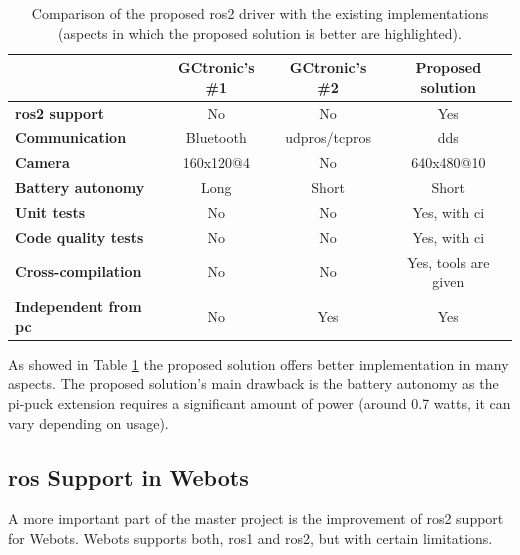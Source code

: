 \begin{table}[H]
    \begin{adjustwidth}{-1.5in}{-1.5in}
    \centering
    \begin{tabular}{|l|c|c|c|}
         \hline
         & \textbf{GCtronic's \#1} & \textbf{GCtronic's \#2} & \textbf{Proposed solution} \\
         \hline
         \rowcolor{lightgray} \textbf{\ac{ros2} support} & No & No & Yes \\
         \hline
         \rowcolor{lightgray} \textbf{Communication} & Bluetooth & \acs{udpros}/\acs{tcpros} & \ac{dds} \\
         \hline
         \rowcolor{lightgray} \textbf{Camera} & 160x120@4 & No & 640x480@10 \\
         \hline
         \textbf{Battery autonomy} & Long & Short & Short \\
         \hline
         \rowcolor{lightgray} \textbf{Unit tests} & No & No & Yes, with \ac{ci} \\
         \hline
         \rowcolor{lightgray} \textbf{Code quality tests} & No & No & Yes, with \ac{ci} \\
         \hline
         \rowcolor{lightgray} \textbf{Cross-compilation} & No & No & Yes, tools are given  \\
         \hline
         \rowcolor{lightgray} \textbf{Independent from \acs{pc}} & No & Yes & Yes  \\
         \hline
    \end{tabular}
    \end{adjustwidth}
    \caption[Comparison of the proposed \ac{ros} drive with the existing implementations]{Comparison of the proposed \ac{ros2} driver with the existing implementations (aspects in which the proposed solution is better are highlighted).}
    \label{tab:background:epuck_ros}
\end{table}

As showed in Table \ref{tab:background:epuck_ros} the proposed solution offers better implementation in many aspects.
The proposed solution's main drawback is the battery autonomy as the pi-puck extension requires a significant amount of power (around 0.7 watts, it can vary depending on usage).


\subsection{\ac{ros} Support in Webots}
A more important part of the master project is the improvement of \ac{ros2} support for Webots.
Webots supports both, \ac{ros}1 and \ac{ros2}, but with certain limitations.

